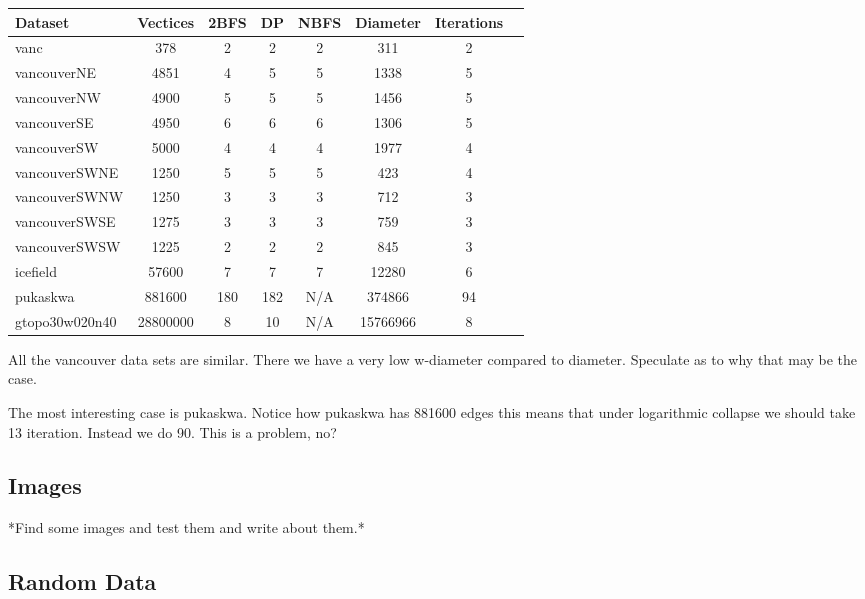 \begin{center}
\begin{tabular}{l*{6}{c}r}
Dataset             & Vectices  & 2BFS  & DP    & NBFS  & Diameter  & Iterations\\
\hline
vanc                & 378       & 2     & 2     & 2     & 311       & 2  \\
vancouverNE         & 4851      & 4     & 5     & 5     & 1338      & 5  \\
vancouverNW         & 4900      & 5     & 5     & 5     & 1456      & 5  \\
vancouverSE         & 4950      & 6     & 6     & 6     & 1306      & 5  \\
vancouverSW         & 5000      & 4     & 4     & 4     & 1977      & 4  \\
vancouverSWNE       & 1250      & 5     & 5     & 5     & 423       & 4  \\
vancouverSWNW       & 1250      & 3     & 3     & 3     & 712       & 3  \\
vancouverSWSE       & 1275      & 3     & 3     & 3     & 759       & 3  \\
vancouverSWSW       & 1225      & 2     & 2     & 2     & 845       & 3  \\
icefield            & 57600     & 7     & 7     & 7     & 12280     & 6  \\
pukaskwa            & 881600    & 180   & 182   & N/A   & 374866    & 94 \\
gtopo30w020n40      & 28800000  & 8     & 10    & N/A   & 15766966  & 8  \\

\end{tabular}
\end{center}

All the vancouver data sets are similar. There we have a very low w-diameter compared to diameter. Speculate as to why that may be the case.

The most interesting case is pukaskwa. Notice how pukaskwa has 881600 edges this means that under logarithmic collapse we should take 13 iteration. Instead we do 90. This is a problem, no?

\subsection{Images}

*Find some images and test them and write about them.*

\subsection{Random Data}


